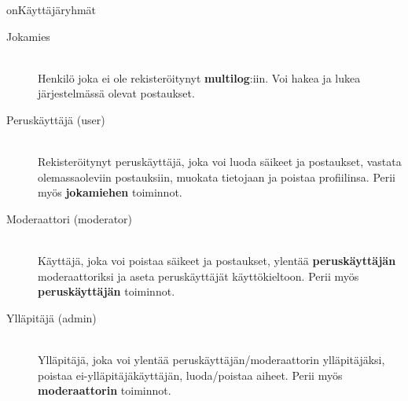 \documentclass[10pt]{article}
\begin{document}
on{Käyttäjäryhmät}
\begin{description}
  \item[Jokamies] \hfill \\
  Henkilö joka ei ole rekisteröitynyt \textbf{multilog}:iin. Voi hakea ja lukea järjestelmässä olevat postaukset.
  \item[Peruskäyttäjä (user)] \hfill \\
  Rekisteröitynyt peruskäyttäjä, joka voi luoda säikeet ja postaukset, vastata olemassaoleviin postauksiin, muokata tietojaan ja poistaa profiilinsa. Perii myös \textbf{jokamiehen} toiminnot.
  \item[Moderaattori (moderator)] \hfill \\
  Käyttäjä, joka voi poistaa säikeet ja postaukset, ylentää \textbf{peruskäyttäjän} moderaattoriksi ja aseta peruskäyttäjät käyttökieltoon. Perii myös \textbf{peruskäyttäjän} toiminnot.
  \item[Ylläpitäjä (admin)] \hfill \\
  Ylläpitäjä, joka voi ylentää peruskäyttäjän/moderaattorin ylläpitäjäksi, poistaa ei-ylläpitäjäkäyttäjän, luoda/poistaa aiheet. Perii myös \textbf{moderaattorin} toiminnot.
\end{description}
\end{document}
